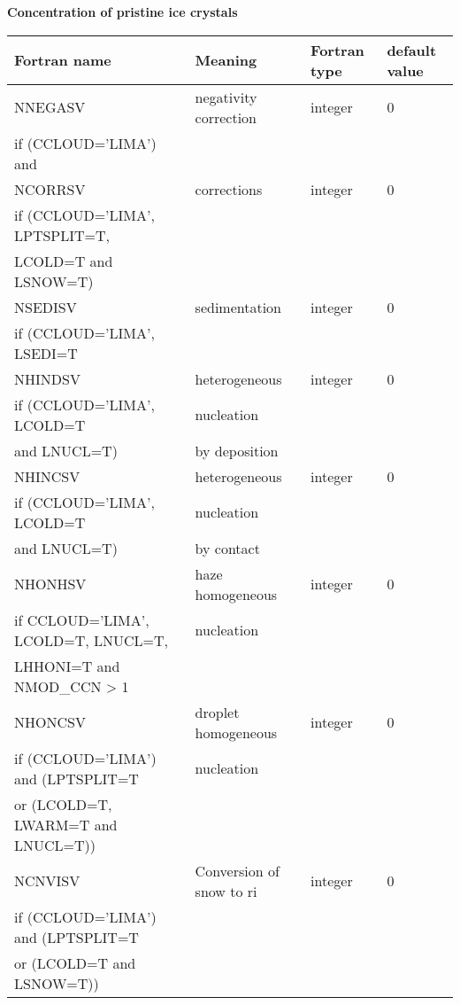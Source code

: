 \textbf{Concentration of pristine ice crystals}
\begin{longtable} {|p{}|p{}|>{\centering}p{}|p{}<{\centering}|}
\hline
Fortran name & Meaning & Fortran type & default value \\
\hline \hline
\endhead
NNEGASV & negativity correction& integer & 0 \\ \nopagebreak
if (CCLOUD='LIMA') and &&& \\\hline

NCORRSV & corrections & integer & 0 \\ \nopagebreak
if (CCLOUD='LIMA', LPTSPLIT=T, &&& \\ \nopagebreak
LCOLD=T and LSNOW=T) &&& \\\hline

NSEDISV & sedimentation& integer & 0 \\ \nopagebreak
if (CCLOUD='LIMA', LSEDI=T &&& \\\hline

NHINDSV & heterogeneous & integer & 0 \\ \nopagebreak
if (CCLOUD='LIMA', LCOLD=T &nucleation && \\ \nopagebreak
and LNUCL=T) & by deposition && \\\hline

NHINCSV & heterogeneous   & integer & 0 \\ \nopagebreak
if (CCLOUD='LIMA', LCOLD=T &nucleation&& \\ \nopagebreak
and LNUCL=T) &by contact && \\\hline

NHONHSV & haze homogeneous  & integer & 0 \\ \nopagebreak
if CCLOUD='LIMA', LCOLD=T, LNUCL=T, &nucleation && \\ \nopagebreak
LHHONI=T and NMOD\_CCN > 1 &&& \\\hline

NHONCSV & droplet homogeneous  & integer & 0 \\ \nopagebreak
if (CCLOUD='LIMA') and (LPTSPLIT=T &nucleation && \\ \nopagebreak
or (LCOLD=T, LWARM=T and LNUCL=T)) &&& \\\hline

NCNVISV & Conversion of snow to ri& integer & 0 \\ \nopagebreak
if (CCLOUD='LIMA') and (LPTSPLIT=T &&& \\ \nopagebreak
or (LCOLD=T and LSNOW=T)) &&& \\\hline


\end{longtable}
